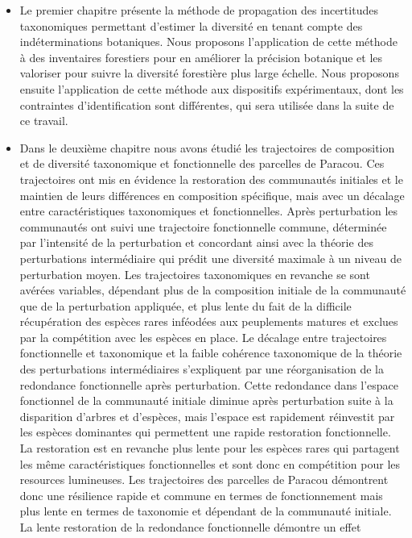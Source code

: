 \documentclass[
  11pt,
  french,
  A4paper,
  extrafontsizes,onecolumn,openright
  ]{memoir}
\begin{document}
\begin{itemize}
\item
  Le premier chapitre présente la méthode de propagation des
  incertitudes taxonomiques permettant d'estimer la diversité en tenant
  compte des indéterminations botaniques. Nous proposons l'application
  de cette méthode à des inventaires forestiers pour en améliorer la
  précision botanique et les valoriser pour suivre la diversité
  forestière plus large échelle. Nous proposons ensuite l'application de
  cette méthode aux dispositifs expérimentaux, dont les contraintes
  d'identification sont différentes, qui sera utilisée dans la suite de
  ce travail.
\item
  Dans le deuxième chapitre nous avons étudié les trajectoires de
  composition et de diversité taxonomique et fonctionnelle des parcelles
  de Paracou. Ces trajectoires ont mis en évidence la restoration des
  communautés initiales et le maintien de leurs différences en
  composition spécifique, mais avec un décalage entre caractéristiques
  taxonomiques et fonctionnelles. Après perturbation les communautés ont
  suivi une trajectoire fonctionnelle commune, déterminée par
  l'intensité de la perturbation et concordant ainsi avec la théorie des
  perturbations intermédiaire qui prédit une diversité maximale à un
  niveau de perturbation moyen. Les trajectoires taxonomiques en
  revanche se sont avérées variables, dépendant plus de la composition
  initiale de la communauté que de la perturbation appliquée, et plus
  lente du fait de la difficile récupération des espèces rares inféodées
  aux peuplements matures et exclues par la compétition avec les espèces
  en place. Le décalage entre trajectoires fonctionnelle et taxonomique
  et la faible cohérence taxonomique de la théorie des perturbations
  intermédiaires s'expliquent par une réorganisation de la redondance
  fonctionnelle après perturbation. Cette redondance dans l'espace
  fonctionnel de la communauté initiale diminue après perturbation suite
  à la disparition d'arbres et d'espèces, mais l'espace est rapidement
  réinvestit par les espèces dominantes qui permettent une rapide
  restoration fonctionnelle. La restoration est en revanche plus lente
  pour les espèces rares qui partagent les même caractéristiques
  fonctionnelles et sont donc en compétition pour les resources
  lumineuses. Les trajectoires des parcelles de Paracou démontrent donc
  une résilience rapide et commune en termes de fonctionnement mais plus
  lente en termes de taxonomie et dépendant de la communauté initiale.
  La lente restoration de la redondance fonctionnelle démontre un effet

\end{itemize}
\end{document}
